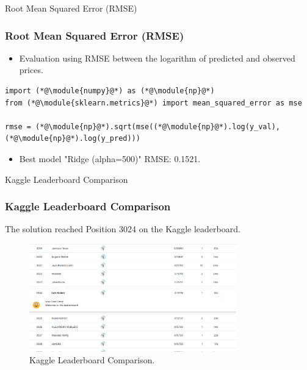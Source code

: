 \begin{frame}[fragile]{Root Mean Squared Error (RMSE)}
    \frametitle{Root Mean Squared Error (RMSE)}
    \begin{itemize}
        \item Evaluation using RMSE between the logarithm of predicted and observed prices.
    \end{itemize}
    \begin{lstlisting}[caption={Calculating RMSE using \texttt{numpy} and \texttt{sklearn}.}, label=lst:rmse_calculation]
import (*@\module{numpy}@*) as (*@\module{np}@*)
from (*@\module{sklearn.metrics}@*) import mean_squared_error as mse

rmse = (*@\module{np}@*).sqrt(mse((*@\module{np}@*).log(y_val), (*@\module{np}@*).log(y_pred)))
    \end{lstlisting}
    \begin{itemize}
        \item Best model "Ridge (alpha=500)" RMSE: 0.1521.
    \end{itemize}
\end{frame}


\begin{frame}{Kaggle Leaderboard Comparison}
    \frametitle{Kaggle Leaderboard Comparison}
    The solution reached Position 3024 on the Kaggle leaderboard.
    \vspace{0.5em}
    \begin{figure}[H]
        \centering
        \includegraphics[width=0.8\textwidth]{figures/leaderboard_comparison.png}
        \caption{Kaggle Leaderboard Comparison.}
        \label{fig:leaderboard_comparisom}
    \end{figure}
\end{frame}
